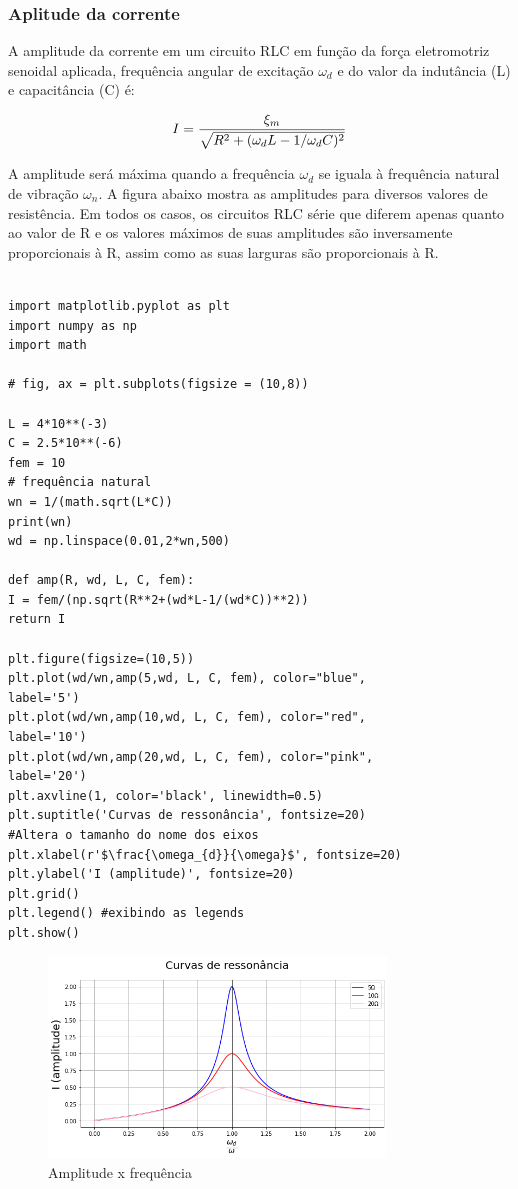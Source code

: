 \subsubsection{Aplitude da corrente}

A amplitude da corrente em um circuito RLC em função da força eletromotriz senoidal aplicada, frequência angular de excitação $\omega_{d}$ e do valor da indutância (L) e capacitância (C) é:

\[\large I = \frac{\xi_{m}}{\sqrt{R^2+(\omega_{d}L-1/\omega_{d}C)^2}}\]

A amplitude será máxima quando a frequência $\omega_{d}$ se iguala à frequência natural de vibração $\omega_{n}$. A figura abaixo mostra as amplitudes para diversos valores de resistência. Em todos os casos, os circuitos RLC série que diferem apenas quanto ao valor de R e os valores máximos de suas amplitudes são inversamente proporcionais à R, assim como as suas larguras são proporcionais à R.

\begin{verbatim}
	
import matplotlib.pyplot as plt
import numpy as np
import math

# fig, ax = plt.subplots(figsize = (10,8))

L = 4*10**(-3)
C = 2.5*10**(-6)
fem = 10
# frequência natural
wn = 1/(math.sqrt(L*C))
print(wn)
wd = np.linspace(0.01,2*wn,500)

def amp(R, wd, L, C, fem):
I = fem/(np.sqrt(R**2+(wd*L-1/(wd*C))**2)) 
return I

plt.figure(figsize=(10,5))
plt.plot(wd/wn,amp(5,wd, L, C, fem), color="blue", 
label='5')
plt.plot(wd/wn,amp(10,wd, L, C, fem), color="red", 
label='10')
plt.plot(wd/wn,amp(20,wd, L, C, fem), color="pink", 
label='20')
plt.axvline(1, color='black', linewidth=0.5)
plt.suptitle('Curvas de ressonância', fontsize=20)
#Altera o tamanho do nome dos eixos
plt.xlabel(r'$\frac{\omega_{d}}{\omega}$', fontsize=20) 
plt.ylabel('I (amplitude)', fontsize=20)
plt.grid()
plt.legend() #exibindo as legends
plt.show()
\end{verbatim}

\begin{figure}[H]
	\centering
	\includegraphics[width=0.8\textwidth]{./Imagens/RLC/rlc4.png} 
	\caption{Amplitude x frequência}
	\label{fig:RLC4}
\end{figure}

